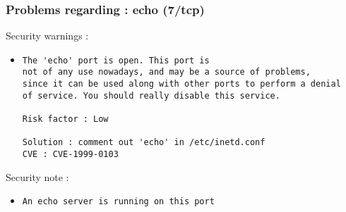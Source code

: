 \documentclass{article}
\begin{document}
\subsubsection{Problems regarding : echo (7/tcp)}
Security warnings :\\
\begin{itemize}
\item \begin{verbatim}
The 'echo' port is open. This port is
not of any use nowadays, and may be a source of problems, 
since it can be used along with other ports to perform a denial
of service. You should really disable this service.

Risk factor : Low

Solution : comment out 'echo' in /etc/inetd.conf
CVE : CVE-1999-0103
\end{verbatim}\end{itemize}
Security note :\\
\begin{itemize}
\item \begin{verbatim}
An echo server is running on this port
\end{verbatim}\end{itemize}
\end{document}

